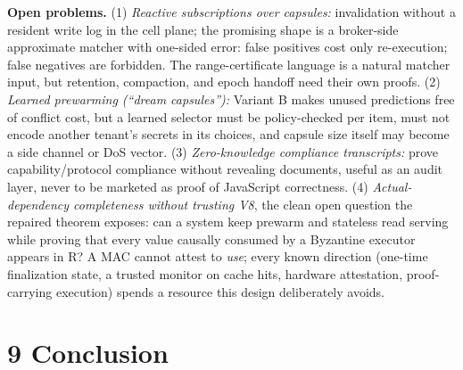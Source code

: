 \documentclass[
  11pt,
]{article}
\begin{document}
\textbf{Open problems.} (1) \emph{Reactive subscriptions over capsules:} invalidation without a resident write log in the cell plane; the promising shape is a broker-side approximate matcher with one-sided error: false positives cost only re-execution; false negatives are forbidden. The range-certificate language is a natural matcher input, but retention, compaction, and epoch handoff need their own proofs. (2) \emph{Learned prewarming (``dream capsules''):} Variant B makes unused predictions free of conflict cost, but a learned selector must be policy-checked per item, must not encode another tenant's secrets in its choices, and capsule size itself may become a side channel or DoS vector. (3) \emph{Zero-knowledge compliance transcripts:} prove capability/protocol compliance without revealing documents, useful as an audit layer, never to be marketed as proof of JavaScript correctness. (4) \emph{Actual-dependency completeness without trusting V8}, the clean open question the repaired theorem exposes: can a system keep prewarm and stateless read serving while proving that every value causally consumed by a Byzantine executor appears in R? A MAC cannot attest to \emph{use}; every known direction (one-time finalization state, a trusted monitor on cache hits, hardware attestation, proof-carrying execution) spends a resource this design deliberately avoids.

\section{9 Conclusion}\label{conclusion}
\end{document}
